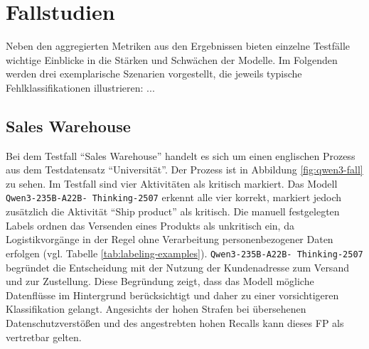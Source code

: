 \section{Fallstudien}\label{sec:fallstudien}

Neben den aggregierten Metriken aus den Ergebnissen bieten einzelne Testfälle wichtige Einblicke in die Stärken und Schwächen der Modelle. Im Folgenden werden drei exemplarische Szenarien vorgestellt, die jeweils typische Fehlklassifikationen illustrieren: ...

\subsection*{Sales Warehouse}

Bei dem Testfall \enquote{Sales Warehouse} handelt es sich um einen englischen Prozess aus dem Testdatensatz \enquote{Universität}. Der Prozess ist in Abbildung \ref{fig:qwen3-fall} zu sehen. Im Testfall sind vier Aktivitäten als kritisch markiert. Das Modell \texttt{Qwen3-235B-A22B-\linebreak~Thinking-2507} erkennt alle vier korrekt, markiert jedoch zusätzlich die Aktivität \enquote{Ship product} als kritisch. Die manuell festgelegten Labels ordnen das Versenden eines Produkts als unkritisch ein, da Logistikvorgänge in der Regel ohne Verarbeitung personenbezogener Daten erfolgen (vgl. Tabelle \ref{tab:labeling-examples}). \texttt{Qwen3-235B-A22B-\linebreak~Thinking-2507} begründet die Entscheidung mit der Nutzung der Kundenadresse zum Versand und zur Zustellung. Diese Begründung zeigt, dass das Modell mögliche Datenflüsse im Hintergrund berücksichtigt und daher zu einer vorsichtigeren Klassifikation gelangt. Angesichts der hohen Strafen bei übersehenen Datenschutzverstößen und des angestrebten hohen Recalls kann dieses \ac{FP} als vertretbar gelten.

